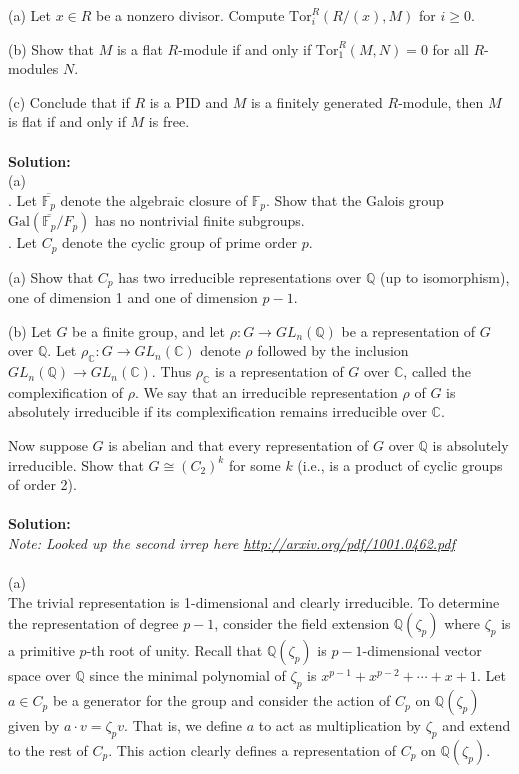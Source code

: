 \documentclass[11pt]{article}
\newcommand{\Q}{\mathbb{Q}}
\newcommand{\F}{\mathbb{F}}
\newcommand{\C}{\mathbb{C}}
\begin{document}
(a) Let $x \in R$ be a nonzero divisor. Compute $\mbox{Tor}_i^R(R/(x), M)$  for $i \ge 0$.

(b) Show that $M$ is a flat $R$-module if and only if $\mbox{Tor}^R_1(M,N) = 0$ for all $R$-modules $N$.

(c) Conclude that if $R$ is a PID and $M$ is a finitely generated $R$-module, then $M$ is
flat if and only if $M$ is free.\\\\
\textbf{Solution:}\\
(a)\\

. Let $\overline{\F_p}$ denote the algebraic closure of $\F_p$. Show that the Galois group $\mbox{Gal}(\overline{\F_p}/F_p)$ has
no nontrivial finite subgroups.\\
. Let $C_p$ denote the cyclic group of prime order $p$.

(a) Show that $C_p$ has two irreducible representations over $\Q$ (up to isomorphism),
one of dimension 1 and one of dimension $p- 1$.

(b) Let $G$ be a finite group, and let $\rho : G\to GL_n(\Q)$ be a representation of $G$
over $\Q$. Let $\rho_\C : G \to GL_n(\C)$ denote $\rho$ followed by the inclusion $GL_n(\Q) \to 
GL_n(\C)$. Thus $\rho_\C$ is a representation of $G$ over $\C$, called the complexification of
$\rho$. We say that an irreducible representation $\rho$ of $G$ is absolutely irreducible if its
complexification remains irreducible over $\C.$

Now suppose $G$ is abelian and that every representation of $G$ over $\Q$ is absolutely
irreducible. Show that $G \cong  (C_2)^k$
for some $k$ (i.e., is a product of cyclic groups
of order 2).\\\\
\textbf{Solution:}\\
\emph{Note: Looked up the second irrep here \url{http://arxiv.org/pdf/1001.0462.pdf}}\\\\
(a)\\
The trivial representation is 1-dimensional and clearly irreducible. To determine the representation of degree $p-1$, consider the field extension $\Q(\zeta_p)$ where $\zeta_p$ is a primitive $p$-th root of unity. Recall that $\Q(\zeta_p)$ is $p-1$-dimensional vector space over $\Q$ since the minimal polynomial of $\zeta_p$ is $x^{p-1}+x^{p-2}+\cdots + x + 1$. Let $a\in C_p$ be a generator for the group and consider the action of $C_p$ on $\Q(\zeta_p)$ given by  $a\cdot v = \zeta_p v$. That is, we define $a$ to act as multiplication by $\zeta_p$ and extend to the rest of $C_p$. This action clearly defines a representation of $C_p$ on $\Q(\zeta_p)$.
\end{document}
